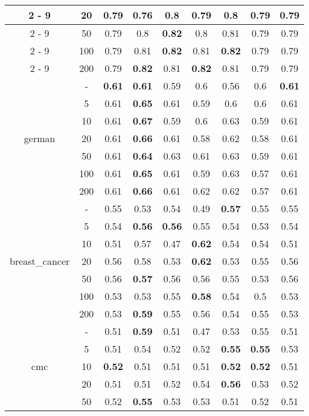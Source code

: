 \documentclass{article}%
\begin{document}
\begin{longtable}{c|c|ccccccc}
\cline{2%
-%
9}%
&20&0.79&0.76&\textbf{0.8}&0.79&\textbf{0.8}&0.79&0.79\\%
\cline{2%
-%
9}%
&50&0.79&0.8&\textbf{0.82}&0.8&0.81&0.79&0.79\\%
\cline{2%
-%
9}%
&100&0.79&0.81&\textbf{0.82}&0.81&\textbf{0.82}&0.79&0.79\\%
\cline{2%
-%
9}%
&200&0.79&\textbf{0.82}&0.81&\textbf{0.82}&0.81&0.79&0.79\\%
\hline%
\multirow{7}{*}{german}&{-}&\textbf{0.61}&\textbf{0.61}&0.59&0.6&0.56&0.6&\textbf{0.61}\\%
\cline{2%
-%
9}%
&5&0.61&\textbf{0.65}&0.61&0.59&0.6&0.6&0.61\\%
\cline{2%
-%
9}%
&10&0.61&\textbf{0.67}&0.59&0.6&0.63&0.59&0.61\\%
\cline{2%
-%
9}%
&20&0.61&\textbf{0.66}&0.61&0.58&0.62&0.58&0.61\\%
\cline{2%
-%
9}%
&50&0.61&\textbf{0.64}&0.63&0.61&0.63&0.59&0.61\\%
\cline{2%
-%
9}%
&100&0.61&\textbf{0.65}&0.61&0.59&0.63&0.57&0.61\\%
\cline{2%
-%
9}%
&200&0.61&\textbf{0.66}&0.61&0.62&0.62&0.57&0.61\\%
\hline%
\multirow{7}{*}{breast\_cancer}&{-}&0.55&0.53&0.54&0.49&\textbf{0.57}&0.55&0.55\\%
\cline{2%
-%
9}%
&5&0.54&\textbf{0.56}&\textbf{0.56}&0.55&0.54&0.53&0.54\\%
\cline{2%
-%
9}%
&10&0.51&0.57&0.47&\textbf{0.62}&0.54&0.54&0.51\\%
\cline{2%
-%
9}%
&20&0.56&0.58&0.53&\textbf{0.62}&0.53&0.55&0.56\\%
\cline{2%
-%
9}%
&50&0.56&\textbf{0.57}&0.56&0.56&0.55&0.53&0.56\\%
\cline{2%
-%
9}%
&100&0.53&0.53&0.55&\textbf{0.58}&0.54&0.5&0.53\\%
\cline{2%
-%
9}%
&200&0.53&\textbf{0.59}&0.55&0.56&0.54&0.55&0.53\\%
\hline%
\multirow{7}{*}{cmc}&{-}&0.51&\textbf{0.59}&0.51&0.47&0.53&0.55&0.51\\%
\cline{2%
-%
9}%
&5&0.51&0.54&0.52&0.52&\textbf{0.55}&\textbf{0.55}&0.53\\%
\cline{2%
-%
9}%
&10&\textbf{0.52}&0.51&0.51&0.51&\textbf{0.52}&\textbf{0.52}&0.51\\%
\cline{2%
-%
9}%
&20&0.51&0.51&0.52&0.54&\textbf{0.56}&0.53&0.52\\%
\cline{2%
-%
9}%
&50&0.52&\textbf{0.55}&0.53&0.53&0.51&0.52&0.51\\%

\end{longtable}
\end{document}

